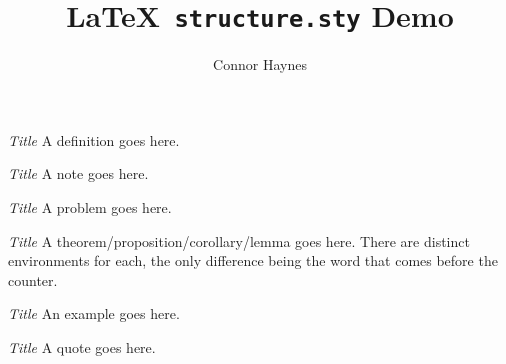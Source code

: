 \documentclass[10pt]{memoir}
\title{\LaTeX \texttt{ structure.sty} Demo}
\author{Connor Haynes}
\date{}
\begin{document}
\maketitle
\begin{boxDef}{\emph{Title}}
  A definition goes here.
\end{boxDef}
\begin{boxNote}{\emph{Title}}
  A note goes here.
\end{boxNote}
\begin{boxProb}{\emph{Title}}
  A problem goes here.
\end{boxProb}
\begin{boxThm}{\emph{Title}}
  A theorem/proposition/corollary/lemma goes here. There are distinct environments for each, the only difference being the word that comes before the counter.
\end{boxThm}
\begin{boxEx}{\emph{Title}}
  An example goes here.
\end{boxEx}
\begin{boxQuote}{\emph{Title}}
  A quote goes here.
\end{boxQuote}
\end{document}
